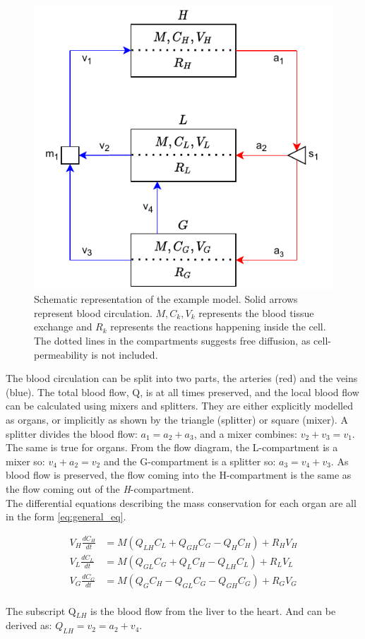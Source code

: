 \documentclass{IEEEtran}
\begin{document}
\begin{figure}[H]
    \centering
    \includegraphics[width=0.87\columnwidth]{Diagrams/example_diagram_v3.pdf}
    \caption{Schematic representation of the example model. Solid arrows represent blood circulation. $M,C_k,V_k$ represents the blood tissue exchange and $R_k$ represents the reactions happening inside the cell. The dotted lines in the compartments suggests free diffusion, as cell-permeability is not included.}
    \label{fig:example_flow}
\end{figure}

The blood circulation can be split into two parts, the arteries (red) and the veins (blue). The total blood flow, Q, is at all times preserved, and the local blood flow can be calculated using mixers and splitters. They are either explicitly modelled as organs, or implicitly as shown by the triangle (splitter) or square (mixer). A splitter divides the blood flow: $a_1 = a_2 + a_3$, and a mixer combines: $v_2+v_3 = v_1$. The same is true for organs. From the flow diagram, the L-compartment is a mixer so: $v_4+a_2 = v_2$ and the G-compartment is a splitter so: $a_3 = v_4+v_3$. As blood flow is preserved, the flow coming into the H-compartment is the same as the flow coming out of the \textit{H}-compartment. \\

The differential equations describing the mass conservation for each organ are all in the form \eqref{eq:general_eq}.

\begin{subequations}
\begin{align}
    V_H\frac{dC_H}{dt} & = M (Q_{LH} C_L + Q_{GH} C_G - Q_H C_H) + R_H V_H \\
    V_L\frac{dC_L}{dt} & = M (Q_{GL} C_G + Q_L C_H - Q_{LH} C_L) + R_L V_L\\
    V_G\frac{dC_G}{dt} & = M (Q_G C_H - Q_{GL} C_G - Q_{GH} C_G) + R_G V_G
\end{align}
\end{subequations} \\
The subscript Q$_{LH}$ is the blood flow from the liver to the heart. And can be derived as: $Q_{LH} = v_2 = a_2+v_4$. \\
\end{document}
